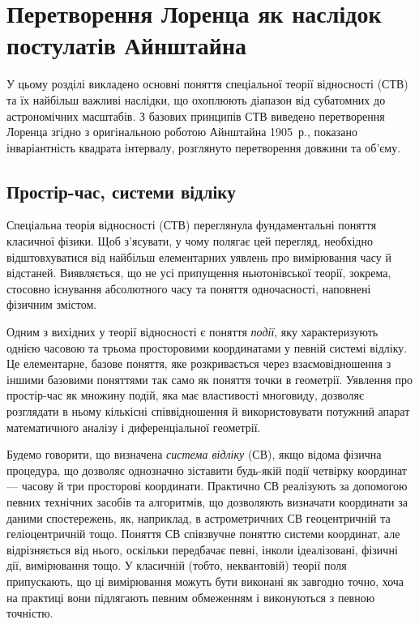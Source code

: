 

\chapter{Перетворення Лоренца як наслідок постулатів Айн\-штайна}\label{\currfilebase}


У цьому розділі викладено основні поняття спеціальної теорії відносності (СТВ) та їх найбільш важливі наслідки, що
охоплюють діапазон від субатомних до астрономічних масштабів. З базових принципів СТВ виведено перетворення Лоренца
згідно з оригінальною роботою Айнштайна 1905~р., показано інваріантність квадрата інтервалу, розглянуто перетворення
довжини та об'єму.

\section{Простір-час, системи відліку}

Спеціальна теорія відносності (СТВ) переглянула фундаментальні поняття класичної фізики. Щоб з'ясувати, у чому полягає
цей перегляд, необхідно відштовхуватися від найбільш елементарних уявлень про вимірювання часу й відстаней. Виявляється,
що не усі припущення ньютонівської теорії, зокрема, стосовно існування абсолютного часу та поняття одночасності,
наповнені фізичним змістом.

Одним з вихідних у теорії відносності є поняття \emph{події}, яку характеризують однією часовою та трьома просторовими
координатами у певній системі відліку. Це елементарне, базове поняття, яке розкривається через взаємовідношення з іншими
базовими поняттями так само як поняття точки в геометрії. Уявлення про простір-час як множину подій, яка має властивості
многовиду, дозволяє розглядати в ньому кількісні співвідношення й використовувати потужний апарат математичного аналізу
і диференціальної геометрії.

Будемо говорити, що визначена \emph{система відліку} (СВ), якщо відома фізична процедура, що дозволяє однозначно
зіставити будь-якій події четвірку координат --- часову й три просторові координати. Практично СВ реалізують за
допомогою певних технічних засобів та алгоритмів, що дозволяють визначати координати за даними спостережень, як,
наприклад, в астрометричних СВ геоцентричній та геліоцентричній тощо. Поняття СВ співзвучне поняттю системи координат,
але відрізняється від нього, оскільки передбачає певні, інколи ідеалізовані, фізичні дії, вимірювання тощо. У класичній
(тобто, неквантовій) теорії поля припускають, що ці вимірювання можуть бути виконані як завгодно точно, хоча на практиці
вони підлягають певним обмеженням і виконуються з певною точністю.


